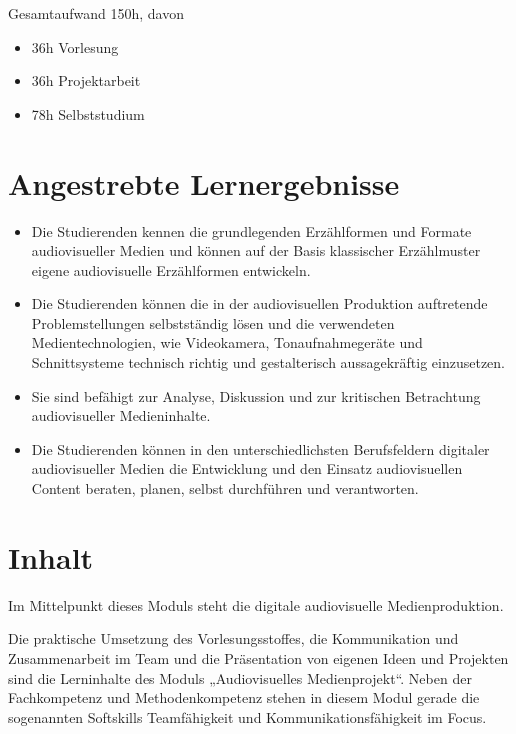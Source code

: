 Gesamtaufwand 150h, davon

\begin{itemize}
\tightlist
\item
  36h Vorlesung
\item
  36h Projektarbeit
\item
  78h Selbststudium
\end{itemize}

\hypertarget{angestrebte-lernergebnissepathlabelmi-2017modulbeschreibungen-bachelorba_avm}{%
\section*{Angestrebte
Lernergebnisse\label{/mi-2017/modulbeschreibungen-bachelor/BA_AVM}}\label{angestrebte-lernergebnissepathlabelmi-2017modulbeschreibungen-bachelorba_avm}}

\begin{itemize}
\tightlist
\item
  Die Studierenden kennen die grundlegenden Erzählformen und Formate
  audiovisueller Medien und können auf der Basis klassischer
  Erzählmuster eigene audiovisuelle Erzählformen entwickeln.
\item
  Die Studierenden können die in der audiovisuellen Produktion
  auftretende Problemstellungen selbstständig lösen und die verwendeten
  Medientechnologien, wie Videokamera, Tonaufnahmegeräte und
  Schnittsysteme technisch richtig und gestalterisch aussagekräftig
  einzusetzen.
\item
  Sie sind befähigt zur Analyse, Diskussion und zur kritischen
  Betrachtung audiovisueller Medieninhalte.
\item
  Die Studierenden können in den unterschiedlichsten Berufsfeldern
  digitaler audiovisueller Medien die Entwicklung und den Einsatz
  audiovisuellen Content beraten, planen, selbst durchführen und
  verantworten.
\end{itemize}

\hypertarget{inhaltpathlabelmi-2017modulbeschreibungen-bachelorba_avm}{%
\section*{Inhalt\label{/mi-2017/modulbeschreibungen-bachelor/BA_AVM}}\label{inhaltpathlabelmi-2017modulbeschreibungen-bachelorba_avm}}

Im Mittelpunkt dieses Moduls steht die digitale audiovisuelle
Medienproduktion.

Die praktische Umsetzung des Vorlesungsstoffes, die Kommunikation und
Zusammenarbeit im Team und die Präsentation von eigenen Ideen und
Projekten sind die Lerninhalte des Moduls „Audiovisuelles
Medienprojekt``. Neben der Fachkompetenz und Methodenkompetenz stehen in
diesem Modul gerade die sogenannten Softskills Teamfähigkeit und
Kommunikationsfähigkeit im Focus.

